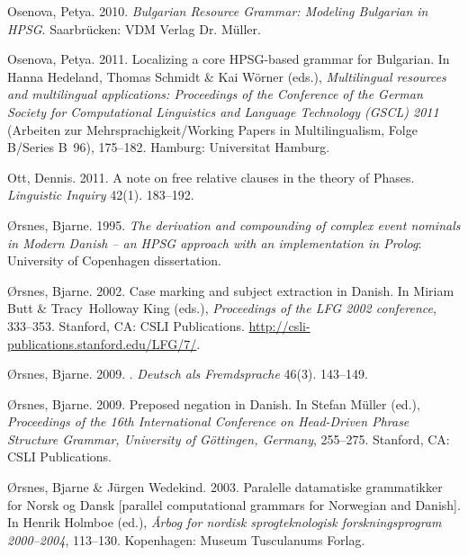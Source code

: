 \begin{thebibliography}{1420}
Osenova, Petya. 2010{}.
\newblock \emph{{Bulgarian Resource Grammar}: Modeling {Bulgarian} in {HPSG}}.
\newblock Saarbr{\"u}cken: VDM Verlag Dr. M{\"u}ller.

Osenova, Petya. 2011.
\newblock Localizing a core {HPSG}-based grammar for {Bulgarian}.
\newblock In Hanna Hedeland, Thomas Schmidt \& Kai W{\"o}rner (eds.),
  \emph{Multilingual resources and multilingual applications: {Proceedings} of
  the {Conference of the German Society for Computational Linguistics and
  Language Technology (GSCL)} 2011} (Arbeiten zur Mehrsprachigkeit/Working
  Papers in Multilingualism, Folge B/Series B~96), 175--182. Hamburg:
  Universitat Hamburg.

Ott, Dennis. 2011.
\newblock A note on free relative clauses in the theory of {Phases}.
\newblock \emph{Linguistic Inquiry} 42(1). 183--192.

{}{\O}rsnes, Bjarne. 1995.
\newblock \emph{The derivation and compounding of complex event nominals in
  {Modern Danish} -- an {HPSG} approach with an implementation in {Prolog}}:
  University of Copenhagen dissertation.

{}{\O}rsnes, Bjarne. 2002.
\newblock Case marking and subject extraction in {Danish}.
\newblock In Miriam Butt \& Tracy~Holloway King (eds.), \emph{Proceedings of
  the {LFG 2002} conference}, 333--353. Stanford, CA: CSLI Publications.
\newblock \urlprefix\url{http://csli-publications.stanford.edu/LFG/7/}.

{}{\O}rsnes, Bjarne. 2009{}.
.
\newblock \emph{Deutsch als Fremdsprache} 46(3). 143--149.

{}{\O}rsnes, Bjarne. 2009{}.
\newblock Preposed negation in {Danish}.
\newblock In Stefan M{\"u}ller (ed.), \emph{Proceedings of the {16th
  International Conference on Head-Driven Phrase Structure Grammar, University
  of G{\"o}ttingen, Germany}}, 255--275. Stanford, CA: CSLI Publications.

{}{\O}rsnes, Bjarne \& J{\"u}rgen Wedekind. 2003.
\newblock Paralelle datamatiske grammatikker for {Norsk og Dansk} [parallel
  computational grammars for {Norwegian} and {Danish}].
\newblock In Henrik Holmboe (ed.), \emph{{\AA}rbog for nordisk sprogteknologisk
  forskningsprogram 2000--2004}, 113--130. Kopenhagen: Museum Tusculanums
  Forlag.


\end{thebibliography}
